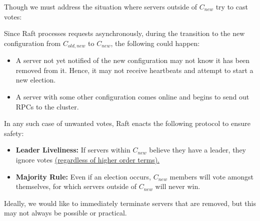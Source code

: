 \newpage

\noindent
Though we must address the situation where servers outside of $C_{new}$ try to 
cast votes:
\begin{Def}

    Since Raft processes requests asynchronously, during the transition to the new configuration 
    from $C_{old,new}$ to $C_{new}$, the following could happen:
    \begin{itemize}
        \item A server not yet notified of the new configuration may not know it has been removed from it.
        Hence, it may not receive heartbeats and attempt to start a new election.
        \item A server with some other configuration comes online and begins to send out RPCs to the cluster.
    \end{itemize}

    \noindent
    In any such case of unwanted votes, Raft enacts the following protocol to ensure safety:
    \begin{itemize}
        \item \textbf{Leader Liveliness:} If servers within $C_{new}$ believe they have a leader, they ignore votes \underline{(regardless of higher order terms).}
        \item \textbf{Majority Rule:} Even if an election occurs, $C_{new}$ members will vote amongst themselves, for which servers outside of $C_{new}$ will never win.
    \end{itemize}

    \noindent
    Ideally, we would like to immediately terminate servers that are removed, but this may not always be possible or practical.
\end{Def}

\newpage
